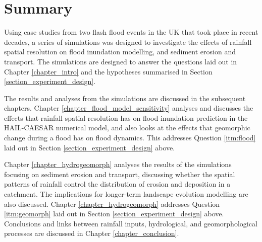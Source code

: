 


%

\section{Summary}

Using case studies from two flash flood events in the UK that took place in recent decades, a series of simulations was designed to investigate the effects of rainfall spatial resolution on flood inundation modelling, and sediment erosion and transport. The simulations are designed to answer the questions laid out in Chapter \ref{chapter_intro} and the hypotheses summarised in Section \ref{section_experiment_design}. 

The results and analyses from the simulations are discussed in the subsequent chapters. Chapter \ref{chapter_flood_model_sensitivity} analyses and discusses the effects that rainfall spatial resolution has on flood inundation prediction in the HAIL-CAESAR numerical model, and also looks at the effects that geomorphic change during a flood has on flood dynamics. This addresses Question \ref{itm:flood} laid out in Section \ref{section_experiment_design} above. 

Chapter \ref{chapter_hydrogeomorph} analyses the results of the simulations focusing on sediment erosion and transport, discussing whether the spatial patterns of rainfall control the distribution of erosion and deposition in a catchment. The implications for longer-term landscape evolution modelling are also discussed. Chapter \ref{chapter_hydrogeomorph} addresses Question \ref{itm:geomorph} laid out in Section \ref{section_experiment_design} above. Conclusions and links between rainfall inputs, hydrological, and geomorphological processes are discussed in Chapter \ref{chapter_conclusion}.

